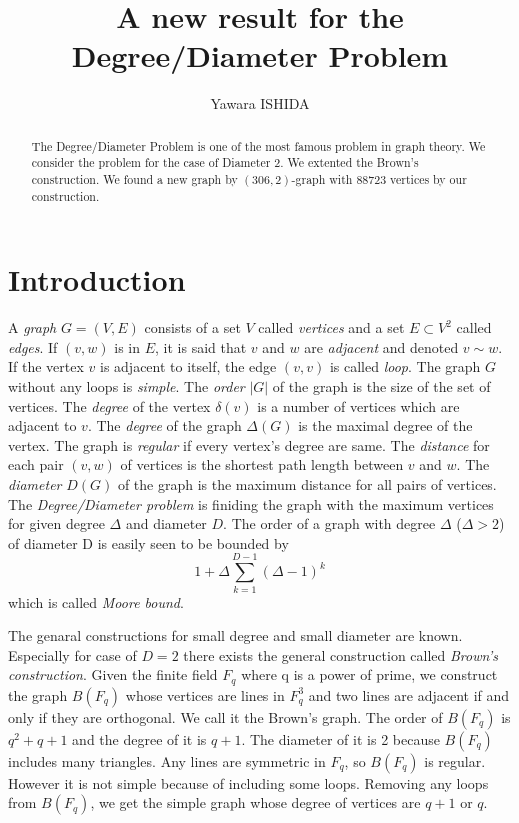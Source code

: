 \documentclass{article}
\title{A new result for the Degree/Diameter Problem}
\author{Yawara ISHIDA}
\begin{document}
\maketitle
\begin{abstract}
The Degree/Diameter Problem is one of the most famous problem in graph theory. 
We consider the problem for the case of Diameter 2.
We extented the Brown's construction.
We found a new graph by $(306,2)$-graph with $88723$ vertices by our construction.
\end{abstract}

\section{Introduction}
A {\it graph} $G=(V,E)$ consists of a set $V$ called {\it vertices} and a set $E \subset V^2$ called {\it edges}.
If $(v,w)$ is in $E$, it is said that $v$ and $w$ are {\it adjacent} and denoted $v \sim w$. 
If the vertex $v$ is adjacent to itself, the edge $(v,v)$ is called {\it loop}.
The graph $G$ without any loops is {\it simple}.
The {\it order} $|G|$ of the graph is the size of the set of vertices. 
The {\it degree} of the vertex $\delta(v)$ is a number of vertices which are adjacent to $v$. 
The {\it degree} of the graph $\Delta(G)$ is the maximal degree  of the vertex.
The graph is {\it regular} if every vertex's degree are same.
The {\it distance} for each pair $(v,w)$ of vertices is the shortest path length between $v$ and $w$. 
The {\it diameter} $D(G)$ of the graph is the  maximum distance for all pairs of vertices. 
The {\it Degree/Diameter problem} is finiding the graph with the maximum vertices for given degree $\Delta$ and diameter $D$. 
The order of a graph with degree $\Delta$ ($\Delta > 2$) of diameter D is easily seen to be bounded by 
\[ 1 + \Delta \sum_{k=1}^{D-1} (\Delta - 1)^k\]
which is called {\it Moore bound}.

The genaral constructions for small degree and small diameter are known. Especially for case of  $D=2$ there exists the general construction called {\it Brown's construction}.
Given the finite field $F_q$ where q is a power of prime, we construct the graph $B(F_q)$ whose vertices are lines in $F_q^3$ and two lines are adjacent if and only if they are orthogonal. 
We call it the Brown's graph.
The order of $B(F_q)$ is $q^2+q+1$ and the degree of it is $q+1$. The diameter of it is 2 because $B(F_q)$ includes many triangles. 
Any lines are symmetric in $F_q$, so $B(F_q)$ is regular. However it is not simple because of including some loops. 
Removing any loops from $B(F_q)$, we get the simple graph whose degree of vertices are $q+1$ or $q$. 
\end{document}
